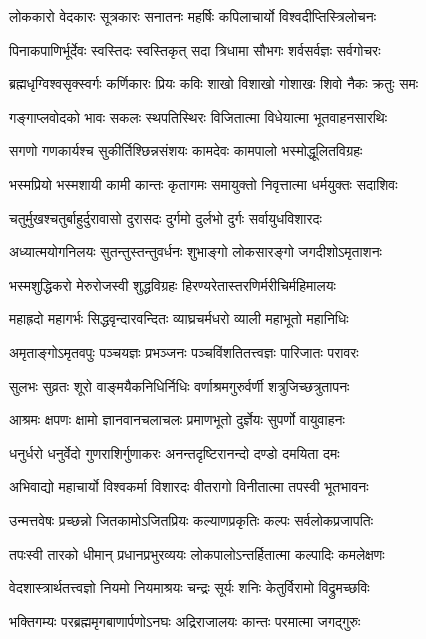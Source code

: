 \twolineshloka
{लोककारो वेदकारः सूत्रकारः सनातनः}
{महर्षिः कपिलाचार्यो विश्वदीप्तिस्त्रिलोचनः}

\twolineshloka
{पिनाकपाणिर्भूर्देवः स्वस्तिदः स्वस्तिकृत् सदा}
{त्रिधामा सौभगः शर्वसर्वज्ञः सर्वगोचरः}

\twolineshloka
{ब्रह्मधृग्विश्वसृक्स्वर्गः कर्णिकारः प्रियः कविः}
{शाखो विशाखो गोशाखः शिवो नैकः क्रतुः समः}

\twolineshloka
{गङ्गाप्लवोदको भावः सकलः स्थपतिस्थिरः}
{विजितात्मा विधेयात्मा भूतवाहनसारथिः}

\twolineshloka
{सगणो गणकार्यश्च सुकीर्तिश्छिन्नसंशयः}
{कामदेवः कामपालो भस्मोद्धूलितविग्रहः}

\twolineshloka
{भस्मप्रियो भस्मशायी कामी कान्तः कृतागमः}
{समायुक्तो निवृत्तात्मा धर्मयुक्तः सदाशिवः}

\twolineshloka
{चतुर्मुखश्चतुर्बाहुर्दुरावासो दुरासदः}
{दुर्गमो दुर्लभो दुर्गः सर्वायुधविशारदः}

\twolineshloka
{अध्यात्मयोगनिलयः सुतन्तुस्तन्तुवर्धनः}
{शुभाङ्गो लोकसारङ्गो जगदीशोऽमृताशनः}

\twolineshloka
{भस्मशुद्धिकरो मेरुरोजस्वी शुद्धविग्रहः}
{हिरण्यरेतास्तरणिर्मरीचिर्महिमालयः}

\twolineshloka
{महाह्रदो महागर्भः सिद्धवृन्दारवन्दितः}
{व्याघ्रचर्मधरो व्याली महाभूतो महानिधिः}

\twolineshloka
{अमृताङ्गोऽमृतवपुः पञ्चयज्ञः प्रभञ्जनः}
{पञ्चविंशतितत्त्वज्ञः पारिजातः परावरः}

\twolineshloka
{सुलभः सुव्रतः शूरो वाङ्मयैकनिधिर्निधिः}
{वर्णाश्रमगुरुर्वर्णी शत्रुजिच्छत्रुतापनः}

\twolineshloka
{आश्रमः क्षपणः क्षामो ज्ञानवानचलाचलः}
{प्रमाणभूतो दुर्ज्ञेयः सुपर्णो वायुवाहनः}

\twolineshloka
{धनुर्धरो धनुर्वेदो गुणराशिर्गुणाकरः}
{अनन्तदृष्टिरानन्दो दण्डो दमयिता दमः}

\twolineshloka
{अभिवाद्यो महाचार्यो विश्वकर्मा विशारदः}
{वीतरागो विनीतात्मा तपस्वी भूतभावनः}

\twolineshloka
{उन्मत्तवेषः प्रच्छन्नो जितकामोऽजितप्रियः}
{कल्याणप्रकृतिः कल्पः सर्वलोकप्रजापतिः}

\twolineshloka
{तपःस्वी तारको धीमान् प्रधानप्रभुरव्ययः}
{लोकपालोऽन्तर्हितात्मा कल्पादिः कमलेक्षणः}

\twolineshloka
{वेदशास्त्रार्थतत्त्वज्ञो नियमो नियमाश्रयः}
{चन्द्रः सूर्यः शनिः केतुर्विरामो विद्रुमच्छविः}

\twolineshloka
{भक्तिगम्यः परब्रह्ममृगबाणार्पणोऽनघः}
{अद्रिराजालयः कान्तः परमात्मा जगद्गुरुः}

